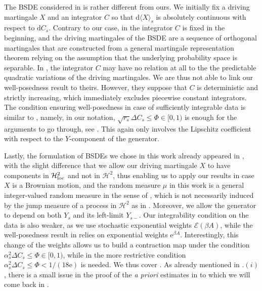 \documentclass[10pt]{article} %
\newcommand\cE{\mathcal E}
\newcommand\cH{\mathcal H}
\def\d{\mathrm{d}}
\begin{document}
\medskip
The BSDE considered in \cite{cohen2012existence} is rather different from ours. We initially fix a driving martingale $X$ and an integrator $C$ so that $\d\langle X \rangle_s$ is absolutely continuous with respect to $\d C_s$. Contrary to our case, in \cite{cohen2012existence} the integrator $C$ is fixed in the beginning, and the driving martingales of the BSDE are a sequence of orthogonal martingales that are constructed from a general martingale representation theorem relying on the assumption that the underlying probability space is separable. In \cite{cohen2012existence}, the integrator $C$ may have no relation at all to the the predictable quadratic variations of the driving martingales. We are thus not able to link our well-posedness result to theirs. However, they suppose that $C$ is deterministic and strictly increasing, which immediately excludes piecewise constant integrators. The condition ensuring well-posedness in case of sufficiently integrable data is similar to \cite{bandini2015existence}, namely, in our notation, $\sqrt{r_s}\Delta C_s \leq \Phi \in[0,1)$ is enough for the arguments to go through, see \cite[Lemma 5.5 and Theorem 6.1]{cohen2012existence}. This again only involves the Lipschitz coefficient with respect to the $Y$-component of the generator. 

\medskip
Lastly, the formulation of BSDEs we chose in this work already appeared in \cite{papapantoleon2018existence}, with the slight difference that we allow our driving martingale $X$ to have components in $\cH^2_\text{\rm loc}$ and not in $\cH^2$, thus enabling us to apply our results in case $X$ is a Brownian motion, and the random measure $\mu$ in this work is a general integer-valued random measure in the sense of \cite{jacod1979calcul,jacod2003limit}, which is not necessarily induced by the jump measure of a process in $\cH^2$ as in \cite{papapantoleon2018existence}. Moreover, we allow the generator to depend on both $Y_s$ and its left-limit $Y_{s-}$. Our integrability condition on the data is also weaker, as we use stochastic exponential weights $\cE(\beta A)$, while the well-posedness result in \cite{papapantoleon2018existence} relies on exponential weights $\mathrm{e}^{\beta A}$. Interestingly, this change of the weights allows us to build a contraction map under the condition $\alpha^2_s \Delta C_s \leq \Phi \in [0,1) $, while in \cite{papapantoleon2018existence} the more restrictive condition $\alpha^2_s \Delta C_s \leq \Phi < 1/(18\mathrm{e})$ is needed. We thus cover \cite[Theorem 3.5]{papapantoleon2018existence}. As already mentioned in .$(i)$, there is a small issue in the proof of the \emph{a priori} estimates in \cite{papapantoleon2018existence} to which we will come back in .
\end{document}

